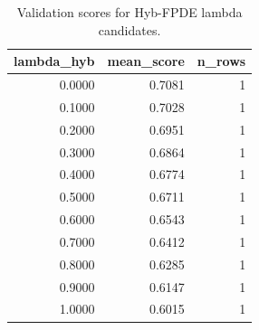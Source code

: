 \begin{table}[t]
\caption{Validation scores for Hyb-FPDE lambda candidates.}
\label{tab:lambda_distribution_computed}
\centering
\begin{tabular}{rrr}
\toprule
lambda\_hyb & mean\_score & n\_rows \\
\midrule
0.0000 & 0.7081 & 1 \\
0.1000 & 0.7028 & 1 \\
0.2000 & 0.6951 & 1 \\
0.3000 & 0.6864 & 1 \\
0.4000 & 0.6774 & 1 \\
0.5000 & 0.6711 & 1 \\
0.6000 & 0.6543 & 1 \\
0.7000 & 0.6412 & 1 \\
0.8000 & 0.6285 & 1 \\
0.9000 & 0.6147 & 1 \\
1.0000 & 0.6015 & 1 \\
\bottomrule
\end{tabular}

\end{table}
